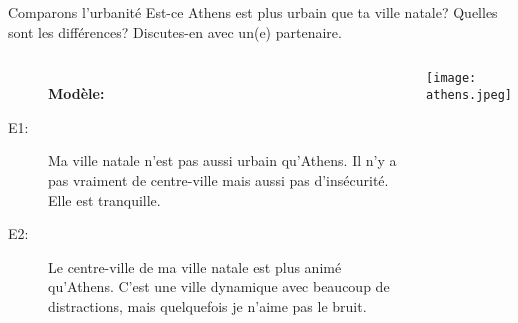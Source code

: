\begin{frame}{Comparons l'urbanité}
  Est-ce Athens est plus urbain que ta ville natale?
  Quelles sont les différences?
  Discutes-en avec un(e) partenaire.
  \begin{columns}
      \small
      \begin{description}
        \item[] \textbf{Modèle:}
        \item[E1:] Ma ville natale n'est pas aussi urbain qu'Athens. Il n'y a pas vraiment de centre-ville mais aussi pas d'insécurité. Elle est tranquille.
        \item[E2:] Le centre-ville de ma ville natale est plus animé qu'Athens. C'est une ville dynamique avec beaucoup de distractions, mais quelquefois je n'aime pas le bruit.
      \end{description}
      \begin{center}
        \texttt{[image: athens.jpeg]}
      \end{center}
  \end{columns}
\end{frame}